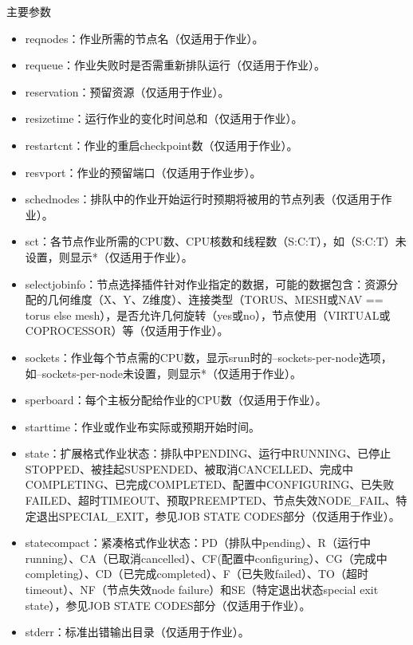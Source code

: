 \begin{frame}[fragile]{主要参数}
\begin{itemize}
\begin{itemize}
\begin{itemize}
   	\item reqnodes：作业所需的节点名（仅适用于作业）。
    \item requeue：作业失败时是否需重新排队运行（仅适用于作业）。
    \item reservation：预留资源（仅适用于作业）。
    \item resizetime：运行作业的变化时间总和（仅适用于作业）。
    \item restartcnt：作业的重启checkpoint数（仅适用于作业）。
    \item resvport：作业的预留端口（仅适用于作业步）。
    \item schednodes：排队中的作业开始运行时预期将被用的节点列表（仅适用于作业）。
    \item sct：各节点作业所需的CPU数、CPU核数和线程数（S:C:T），如（S:C:T）未设置，则显示*（仅适用于作业）。
    \item selectjobinfo：节点选择插件针对作业指定的数据，可能的数据包含：资源分配的几何维度（X、Y、Z维度）、连接类型（TORUS、MESH或NAV == torus else mesh），是否允许几何旋转（yes或no），节点使用（VIRTUAL或COPROCESSOR）等（仅适用于作业）。
    \item sockets：作业每个节点需的CPU数，显示srun时的--sockets-per-node选项，如--sockets-per-node未设置，则显示*（仅适用于作业）。
    \item sperboard：每个主板分配给作业的CPU数（仅适用于作业）。
    \item starttime：作业或作业布实际或预期开始时间。
    \item state：扩展格式作业状态：排队中PENDING、运行中RUNNING、已停止STOPPED、被挂起SUSPENDED、被取消CANCELLED、完成中COMPLETING、已完成COMPLETED、配置中CONFIGURING、已失败FAILED、超时TIMEOUT、预取PREEMPTED、节点失效NODE\_FAIL、特定退出SPECIAL\_EXIT，参见JOB STATE CODES部分（仅适用于作业）。
    \item statecompact：紧凑格式作业状态：PD（排队中pending）、R（运行中running）、CA（已取消cancelled）、CF(配置中configuring）、CG（完成中completing）、CD（已完成completed）、F（已失败failed）、TO（超时timeout）、NF（节点失效node failure）和SE（特定退出状态special exit state），参见JOB STATE CODES部分（仅适用于作业）。
    \item stderr：标准出错输出目录（仅适用于作业）。

\end{itemize}
\end{itemize}
\end{itemize}
\end{frame}
